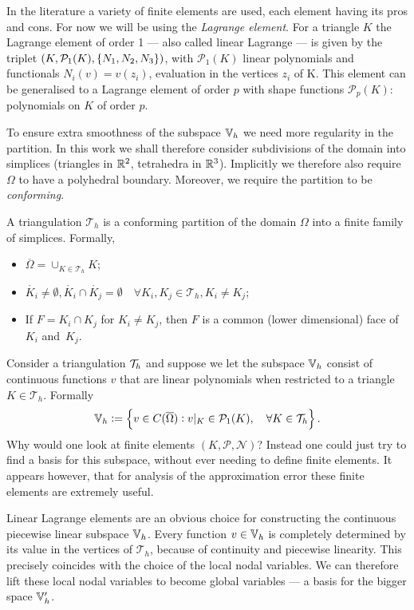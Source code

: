 \documentclass[thesis.tex]{subfiles}
\begin{document}
  In the literature a variety of finite elements are used, each element having its pros and cons. For now we will be using  the \emph{Lagrange element}.
  For a triangle $K$ the Lagrange element of order 1 --- also called linear Lagrange --- is given by the 
  triplet $(K, \mathcal{P}_1(K), \set{N_1, N_2, N_3})$, with $\mathcal{P}_1(K)$ linear polynomials and functionals $N_i(v) = v(z_i)$,
  evaluation in the vertices $z_i$ of K. This element can be generalised to a Lagrange element of order $p$ with shape functions $\mathcal{P}_p(K)$: polynomials on $K$ of order $p$.

  To ensure extra smoothness of the subspace $\mathbb{V}_h$ we need more regularity in the partition. In this work  we shall therefore consider subdivisions of the domain into simplices (triangles in $\mathbb{R}^2$, tetrahedra in $\mathbb{R}^3$). Implicitly we therefore also require $\Omega$ to have a polyhedral boundary. Moreover, we require the partition to be \emph{conforming}.
  \begin{defn}
    A triangulation $\mathcal{T}_h$ is a conforming partition of the domain $\Omega$ into a finite family of simplices.
    Formally,
    \begin{itemize}
      \item $\overline{\Omega} = \cup_{K \in \mathcal{T}_h} K$;
      \item $\mathring{K_i} \ne \emptyset, \mathring{K_i} \cap \mathring{K_j} = \emptyset \quad \forall K_i, K_j \in \mathcal{T}_h, K_i \ne K_j$;
    \item If $F = K_i \cap K_j$ for $K_i \ne K_j$, then $F$ is a common (lower dimensional) face of $K_i$ and~$K_j$.
  \end{itemize}
  \end{defn}
  Consider a triangulation $\mathcal{T}_h$ and suppose we let the subspace $\mathbb{V}_h$ consist
  of continuous functions $v$ that are linear polynomials when restricted to a triangle $K \in \mathcal{T}_h$. Formally
  \[
    \mathbb{V}_h := \set{v \in C(\overline{\Omega}) : v|_{K} \in \mathcal{P}_1(K), \quad \forall K \in \mathcal{T}_h}.
  \]
  Why
  would one look at finite elements $(K, \mathcal{P}, \mathcal{N})$? 
  Instead one could just try to find a basis for this subspace, without ever needing to define finite elements.
  It appears however, that for analysis of the approximation error these finite elements are extremely useful.

  Linear Lagrange elements are an obvious choice for constructing the continuous piecewise linear subspace $\mathbb{V}_h$.
  Every function $v \in \mathbb{V}_h$ is completely
  determined by its value in the vertices of $\mathcal{T}_h$, because of continuity and piecewise linearity.
  This precisely coincides with the choice of the local nodal variables. We can therefore lift these local nodal variables to become
  global variables --- a basis for the bigger space $\mathbb{V}_h'$.
  
\end{document}
